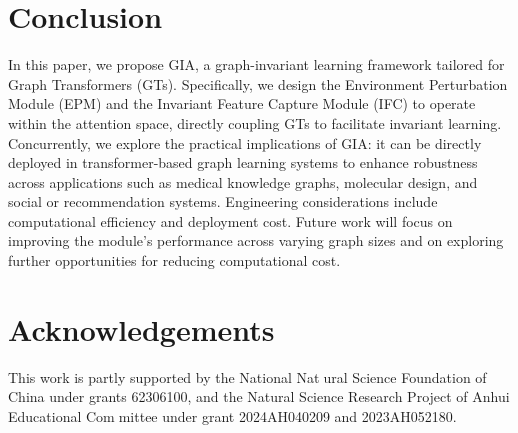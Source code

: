 \documentclass[a4paper,fleqn]{cas-dc}
\begin{document}
\section{Conclusion}

{\color{blue}In this paper, we propose GIA, a graph-invariant learning framework tailored for Graph Transformers (GTs). Specifically, we design the Environment Perturbation Module (EPM) and the Invariant Feature Capture Module (IFC) to operate within the attention space, directly 
coupling GTs to facilitate invariant learning. Concurrently, we explore the practical implications of GIA: it can be directly deployed in transformer-based graph learning systems to enhance robustness across applications such as medical knowledge graphs, molecular design, and social or 
recommendation systems. Engineering considerations include computational efficiency and deployment cost. Future work will focus on improving the module's performance across varying graph sizes and on exploring further opportunities for reducing computational cost.}





\section{Acknowledgements}
This work is partly supported by the National Natural Science Foundation of China under grants 62306100, and the Natural Science Research Project of Anhui Educational Committee under grant 2024AH040209 and 2023AH052180.
\end{document}
